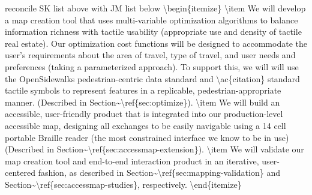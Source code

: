 \ac{
reconcile SK list above with JM list below
\begin{itemize}
\item We will develop a map creation tool that uses multi-variable optimization algorithms to balance information richness with tactile usability (appropriate use and density of tactile real estate). Our optimization cost functions will be designed to accommodate the user’s requirements about the area of travel, type of travel, and user needs and preferences (taking a parameterized approach).  To support this, we will will use the OpenSidewalks pedestrian-centric data standard and \ac{citation} standard tactile symbols to represent features in a replicable, pedestrian-appropriate manner. (Described in Section~\ref{sec:optimize}).
\item  We will build an accessible, user-friendly product that is integrated into our  production-level accessible map, designing all exchanges to be easily navigable  using a 14 cell portable Braille reader (the most constrained interface we know to be in use)  (Described in Section~\ref{sec:accessmap-extension}).
\item We will validate our map creation tool and end-to-end interaction product in an iterative, user-centered fashion, as described in Section~\ref{sec:mapping-validation} and Section~\ref{sec:accessmap-studies}, respectively. 
\end{itemize}
}

